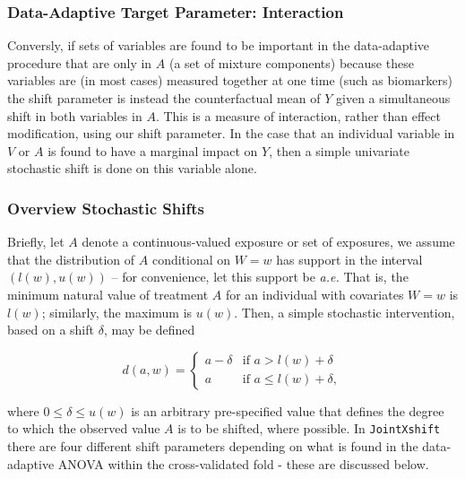 \documentclass[
]{article}
\begin{document}
\hypertarget{data-adaptive-target-parameter-interaction}{%
\subsubsection{Data-Adaptive Target Parameter:
Interaction}\label{data-adaptive-target-parameter-interaction}}

Conversly, if sets of variables are found to be important in the
data-adaptive procedure that are only in \(A\) (a set of mixture
components) because these variables are (in most cases) measured
together at one time (such as biomarkers) the shift parameter is instead
the counterfactual mean of \(Y\) given a simultaneous shift in both
variables in \(A\). This is a measure of interaction, rather than effect
modification, using our shift parameter. In the case that an individual
variable in \(V\) or \(A\) is found to have a marginal impact on \(Y\),
then a simple univariate stochastic shift is done on this variable
alone.

\hypertarget{overview-stochastic-shifts}{%
\subsubsection{Overview Stochastic
Shifts}\label{overview-stochastic-shifts}}

Briefly, let \(A\) denote a continuous-valued exposure or set of
exposures, we assume that the distribution of \(A\) conditional on
\(W = w\) has support in the interval \((l(w), u(w))\) -- for
convenience, let this support be \emph{a.e.} That is, the minimum
natural value of treatment \(A\) for an individual with covariates
\(W = w\) is \(l(w)\); similarly, the maximum is \(u(w)\). Then, a
simple stochastic intervention, based on a shift \(\delta\), may be
defined

\begin{equation}\label{eqn:shift}
  d(a, w) =
  \begin{cases}
    a - \delta & \text{if } a > l(w) + \delta \\
    a & \text{if } a \leq l(w) + \delta,
  \end{cases}
\end{equation}

where \(0 \leq \delta \leq u(w)\) is an arbitrary pre-specified value
that defines the degree to which the observed value \(A\) is to be
shifted, where possible. In \texttt{JointXshift} there are four different
shift parameters depending on what is found in the data-adaptive ANOVA
within the cross-validated fold - these are discussed below.
\end{document}
